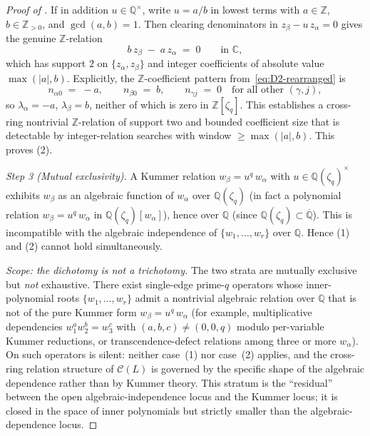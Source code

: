 \documentclass[aip,jmp,preprint,amsmath,amssymb,nofootinbib,floatfix]{revtex4-2}
\theoremstyle{plain}
\theoremstyle{definition}
\theoremstyle{remark}
\newcommand{\Cl}{\mathcal{C}}
\newcommand{\Zlc}{\mathbb{Z}[\zeta_q]}
\newcommand{\Qlc}{\mathbb{Q}(\zeta_q)}
\begin{document}
\begin{proof}[Proof of ]
If in addition $u \in \mathbb{Q}^\times$, write $u = a / b$ in lowest
terms with $a \in \mathbb{Z}$, $b \in \mathbb{Z}_{> 0}$, and
$\gcd(a, b) = 1$. Then clearing denominators in $z_\beta - u\, z_\alpha
= 0$ gives the genuine $\mathbb{Z}$-relation
\begin{equation}\label{eq:D2-Z-relation}
   b\, z_\beta \;-\; a\, z_\alpha \;=\; 0
   \qquad \text{in } \mathbb{C},
\end{equation}
which has support $2$ on $\{z_\alpha, z_\beta\}$ and integer
coefficients of absolute value $\max(|a|, b)$. Explicitly, the
$\mathbb{Z}$-coefficient pattern from~\eqref{eq:D2-rearranged} is
\[
   n_{\alpha 0} \;=\; -a, \qquad
   n_{\beta 0}  \;=\; b, \qquad
   n_{\gamma j} \;=\; 0 \quad
   \text{for all other } (\gamma, j),
\]
so $\lambda_\alpha = -a$, $\lambda_\beta = b$, neither of which is
zero in $\Zlc$. This establishes a cross-ring nontrivial
$\mathbb{Z}$-relation of support two and bounded coefficient size
that is detectable by integer-relation searches with window
$\ge \max(|a|, b)$. This proves (2).

\smallskip
\textit{Step 3 (Mutual exclusivity).}
A Kummer relation $w_\beta = u^q\, w_\alpha$ with $u \in \Qlc^\times$
exhibits $w_\beta$ as an algebraic function of $w_\alpha$ over $\Qlc$
(in fact a polynomial relation $w_\beta = u^q\, w_\alpha$ in
$\Qlc[w_\alpha]$), hence over $\mathbb{Q}$ (since $\Qlc \subset
\overline{\mathbb{Q}}$). This is incompatible with the algebraic
independence of $\{w_1, \dots, w_r\}$ over $\mathbb{Q}$. Hence (1)
and (2) cannot hold simultaneously.

\smallskip
\textit{Scope: the dichotomy is not a trichotomy.}
The two strata are mutually exclusive but \emph{not} exhaustive. There
exist single-edge prime-$q$ operators whose inner-polynomial roots
$\{w_1, \dots, w_r\}$ admit a nontrivial algebraic relation over
$\mathbb{Q}$ that is not of the pure Kummer form $w_\beta = u^q\,
w_\alpha$ (for example, multiplicative dependencies $w_1^a w_2^b =
w_3^c$ with $(a, b, c) \ne (0, 0, q)$ modulo per-variable Kummer
reductions, or transcendence-defect relations among three or more
$w_\alpha$). On such operators  is silent: neither
case~(1) nor case~(2) applies, and the cross-ring relation structure
of $\Cl(L)$ is governed by the specific shape of the algebraic
dependence rather than by Kummer theory. This stratum is the
``residual'' between the open algebraic-independence locus and the
Kummer locus; it is closed in the space of inner polynomials but
strictly smaller than the algebraic-dependence locus.
\end{proof}
\end{document}
